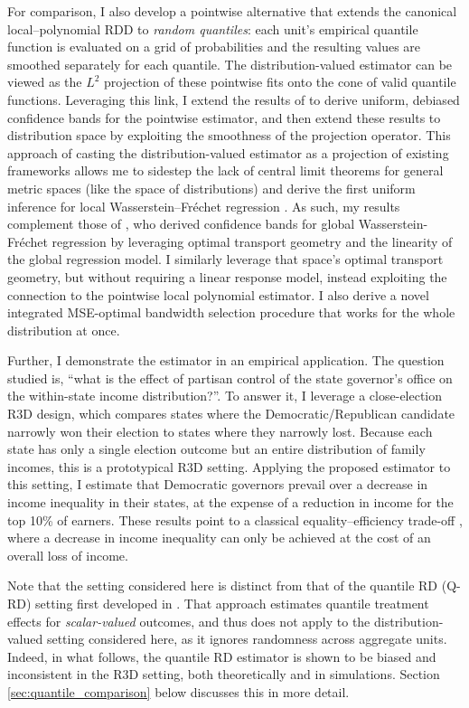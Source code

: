 \documentclass[12pt]{article}
\begin{document}
For comparison, I also develop a pointwise alternative that extends the canonical local–polynomial RDD to \emph{random quantiles}: each unit’s empirical quantile function is evaluated on a grid of probabilities and the resulting values are smoothed separately for each quantile. The distribution-valued estimator can be viewed as the \(L^{2}\) projection of these pointwise fits onto the cone of valid quantile functions. Leveraging this link, I extend the results of \citet{chiang2019robust} to derive uniform, debiased confidence bands for the pointwise estimator, and then extend these results to distribution space by exploiting the smoothness of the projection operator. This approach of casting the distribution-valued estimator as a projection of existing frameworks allows me to sidestep the lack of central limit theorems for general metric spaces (like the space of distributions) and derive the first uniform inference for local Wasserstein–Fr\'echet regression \citep{dubey2019frechet}. As such, my results complement those of \citet{petersen2021wasserstein}, who derived confidence bands for global Wasserstein-Fr\'echet regression by leveraging optimal transport geometry and the linearity of the global regression model. I similarly leverage that space's optimal transport geometry, but without requiring a linear response model, instead exploiting the connection to the pointwise local polynomial estimator. I also derive a novel integrated MSE-optimal bandwidth selection procedure that works for the whole distribution at once.   

Further, I demonstrate the estimator in an empirical application. The question studied is, ``what is the effect of partisan control of the state governor's office on the within-state income distribution?''. To answer it, I leverage a close-election R3D design, which compares states where the Democratic/Republican candidate narrowly won their election to states where they narrowly lost. Because each state has only a single election outcome but an entire distribution of family incomes, this is a prototypical R3D setting. Applying the proposed estimator to this setting, I estimate that Democratic governors prevail over a decrease in income inequality in their states, at the expense of a reduction in income for the top 10\% of earners. These results point to a classical equality--efficiency trade-off \citep{okun1975equality}, where a decrease in income inequality can only be achieved at the cost of an overall loss of income. 

 Note that the setting considered here is distinct from that of the quantile RD (Q-RD) setting first developed in \citet{frandsen2012quantile}. That approach estimates quantile treatment effects for \emph{scalar-valued} outcomes, and thus does not apply to the distribution-valued setting considered here, as it ignores randomness across aggregate units. Indeed, in what follows, the quantile RD estimator is shown to be biased and inconsistent in the R3D setting, both theoretically and in simulations. Section \ref{sec:quantile_comparison} below discusses this in more detail.
\end{document}
